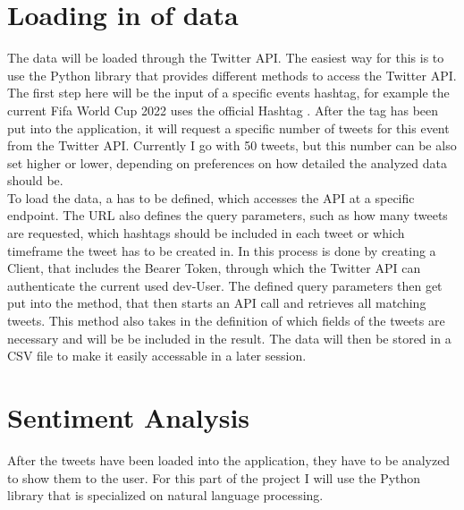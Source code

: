 \documentclass[a4paper,oneside,11pt]{scrreprt}
\begin{document}



\newpage


\chapter{Loading in of data}

The data will be loaded through the Twitter API. The easiest way for this is to use the Python library  that provides different methods to access the Twitter API. The first step here will be the input of a specific events hashtag, for example the current Fifa World Cup 2022 uses the official Hashtag . After the tag has been put into the application, it will request a specific number of tweets for this event from the Twitter API. Currently I go with 50 tweets, but this number can be also set higher or lower, depending on preferences on how detailed the analyzed data should be. \\

To load the data, a  has to be defined, which accesses the API at a specific endpoint. The URL also defines the query parameters, such as how many tweets are requested, which hashtags should be included in each tweet or which timeframe the tweet has to be created in. In  this process is done by creating a  Client, that includes the Bearer Token, through which the Twitter API can authenticate the current used dev-User. The defined query parameters then get put into the  method, that then starts an API call and retrieves all matching tweets. This method also takes in the definition of which fields of the tweets are necessary and will be be included in the result. The data will then be stored in a CSV file to make it easily accessable in a later session.


\chapter{Sentiment Analysis}

After the tweets have been loaded into the application, they have to be analyzed to show them to the user. For this part of the project I will use the Python library  that is specialized on natural language processing.
\end{document}
